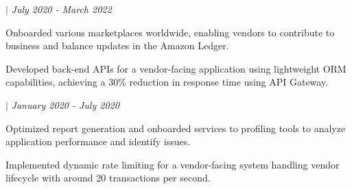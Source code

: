     \hspace{17pt}  $|$ \textit{July 2020 - March 2022 }
    \experienceItemListStart
        \item  Onboarded various marketplaces worldwide, enabling vendors to contribute to business and balance updates in the Amazon Ledger.  
        \item  Developed back-end APIs for a vendor-facing application using lightweight ORM capabilities, achieving a 30\% reduction in response time using API Gateway.  
    \experienceItemListEnd

    \hspace{17pt}  $|$ \textit{January 2020 - July 2020}
    \experienceItemListStart
        \item  Optimized report generation and onboarded services to profiling tools to analyze application performance and identify issues.
        \item  Implemented dynamic rate limiting for a vendor-facing system handling vendor lifecycle with around 20 transactions per second. 
    \experienceItemListEnd

